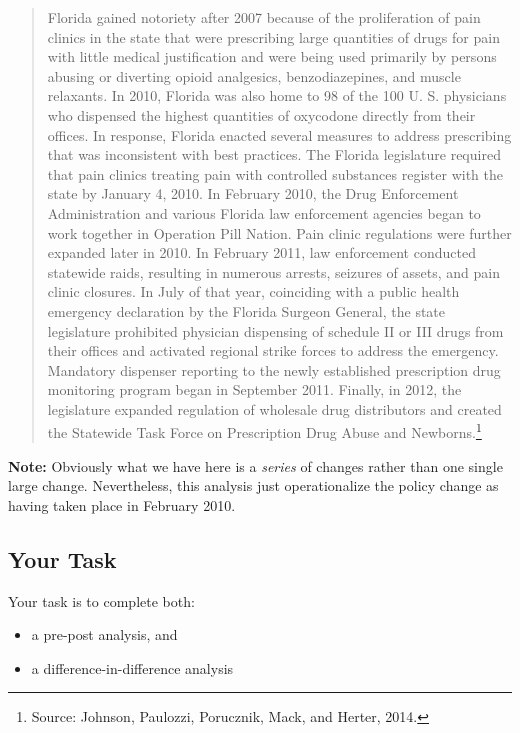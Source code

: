 \documentclass[12pt]{article}
\begin{document}
\begin{quotation}
Florida gained notoriety after 2007 because of the proliferation of pain clinics in the state that were prescribing large quantities of drugs for pain with little medical justification and were being used primarily by persons abusing or diverting opioid analgesics, benzodiazepines, and muscle relaxants. In 2010, Florida was also home to 98 of the 100 U. S. physicians who dispensed the highest quantities of oxycodone directly from their offices. In response, Florida enacted several measures to address prescribing that was inconsistent with best practices. The Florida legislature required that pain clinics treating pain with controlled substances register with the state by January 4, 2010. In February 2010, the Drug Enforcement Administration and various Florida law enforcement agencies began to work together in Operation Pill Nation. Pain clinic regulations were further expanded later in 2010. In February 2011, law enforcement conducted statewide raids, resulting in numerous arrests, seizures of assets, and pain clinic closures. In July of that year, coinciding with a public health emergency declaration by the Florida Surgeon General, the state legislature prohibited physician dispensing of schedule II or III drugs from their offices and activated regional strike forces to address the emergency. Mandatory dispenser reporting to the newly established prescription drug monitoring program began in September 2011. Finally, in 2012, the legislature expanded regulation of wholesale drug distributors and created the Statewide Task Force on Prescription Drug Abuse and Newborns.\footnote{Source: Johnson, Paulozzi, Porucznik, Mack, and Herter, 2014.}
\end{quotation}

\textbf{Note:} Obviously what we have here is a \emph{series} of changes rather than one single large change. Nevertheless, this analysis just operationalize the policy change as having taken place in February 2010.

\subsection*{Your Task}

Your task is to complete both:

\begin{itemize}
  \item a pre-post analysis, and
  \item a difference-in-difference analysis
\end{itemize}
\end{document}

